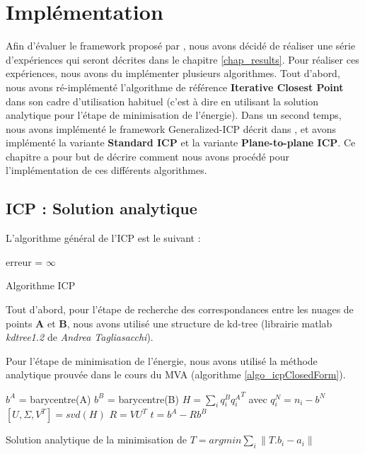 \section{Implémentation}
Afin d'évaluer le framework proposé par \cite{bib_gicp}, nous avons décidé de réaliser une série d'expériences qui seront décrites dans le chapitre \ref{chap_results}. Pour réaliser ces expériences, nous avons du implémenter plusieurs algorithmes. Tout d'abord, nous avons ré-implémenté l'algorithme de référence \textbf{Iterative Closest Point} dans son cadre d'utilisation habituel (c'est à dire en utilisant la solution analytique pour l'étape de minimisation de l'énergie).  Dans un second temps, nous avons implémenté le framework Generalized-ICP décrit dans \cite{bib_gicp}, et avons implémenté la variante \textbf{Standard ICP} et la variante \textbf{Plane-to-plane ICP}. Ce chapitre a pour but de décrire comment nous avons procédé pour l'implémentation de ces différents algorithmes.

\subsection{ICP : Solution analytique}

L'algorithme général de l'ICP est le suivant :\\

\begin{algorithm}[H]
erreur = $\infty$\;
\caption{Algorithme ICP}
\label{algo_icp}
\end{algorithm}

Tout d'abord, pour l'étape de recherche des correspondances entre les nuages de points $\mathbf{A}$ et $\mathbf{B}$, nous avons utilisé une structure de kd-tree (librairie matlab \textit{kdtree1.2} de \textit{Andrea Tagliasacchi}).

Pour l'étape de minimisation de l'énergie, nous avons utilisé la méthode analytique prouvée dans le cours du MVA (algorithme \ref{algo_icpClosedForm}).\\

\begin{algorithm}[H]
$b^{A}$ = barycentre(A)\;
$b^{B}$ = barycentre(B)\;
$H = \sum_{i}q_{i}^{B}{q_{i}^{A}}^T$ avec $q_{i}^{N} = n_{i}-b^{N}$\;
$[U,\Sigma,V^{T}] = svd(H)$\;
$R = VU^{T}$\;
$t = b^{A}-Rb^{B}$\;
\caption{Solution analytique de la minimisation de $T = arg min \sum_{i}{\|T.b_{i}-a_{i}\|}$}
\label{algo_icpClosedForm}
\end{algorithm}


